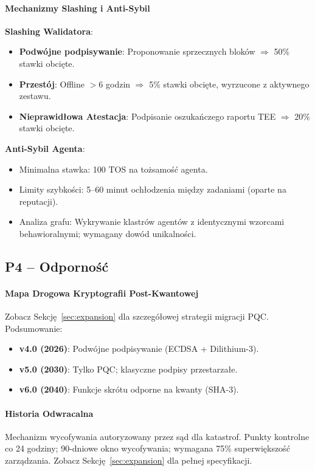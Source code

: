 \documentclass[11pt]{article}
\begin{document}
\paragraph{Mechanizmy Slashing i Anti-Sybil}
\textbf{Slashing Walidatora}:
\begin{itemize}[noitemsep]
  \item \textbf{Podwójne podpisywanie}: Proponowanie sprzecznych bloków $\Rightarrow$ 50\% stawki obcięte.
  \item \textbf{Przestój}: Offline $>$6 godzin $\Rightarrow$ 5\% stawki obcięte, wyrzucone z aktywnego zestawu.
  \item \textbf{Nieprawidłowa Atestacja}: Podpisanie oszukańczego raportu TEE $\Rightarrow$ 20\% stawki obcięte.
\end{itemize}

\textbf{Anti-Sybil Agenta}:
\begin{itemize}[noitemsep]
  \item Minimalna stawka: 100 TOS na tożsamość agenta.
  \item Limity szybkości: 5--60 minut ochłodzenia między zadaniami (oparte na reputacji).
  \item Analiza grafu: Wykrywanie klastrów agentów z identycznymi wzorcami behawioralnymi; wymagany dowód unikalności.
\end{itemize}

\subsection{P4 -- Odporność}
\label{sec:pillar-resilience}

\paragraph{Mapa Drogowa Kryptografii Post-Kwantowej}
Zobacz Sekcję~\ref{sec:expansion} dla szczegółowej strategii migracji PQC. Podsumowanie:
\begin{itemize}[noitemsep]
  \item \textbf{v4.0 (2026)}: Podwójne podpisywanie (ECDSA + Dilithium-3).
  \item \textbf{v5.0 (2030)}: Tylko PQC; klasyczne podpisy przestarzałe.
  \item \textbf{v6.0 (2040)}: Funkcje skrótu odporne na kwanty (SHA-3).
\end{itemize}

\paragraph{Historia Odwracalna}
Mechanizm wycofywania autoryzowany przez sąd dla katastrof. Punkty kontrolne co 24 godziny; 90-dniowe okno wycofywania; wymagana 75\% superwiększość zarządzania. Zobacz Sekcję~\ref{sec:expansion} dla pełnej specyfikacji.
\end{document}
